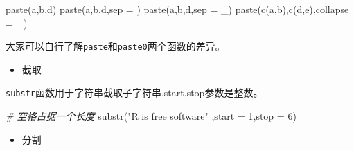 \documentclass[
]{book}
\newenvironment{Shaded}{\begin{snugshade}}{\end{snugshade}}
\newcommand{\AttributeTok}[1]{\textcolor[rgb]{0.77,0.63,0.00}{#1}}
\newcommand{\CommentTok}[1]{\textcolor[rgb]{0.56,0.35,0.01}{\textit{#1}}}
\newcommand{\DecValTok}[1]{\textcolor[rgb]{0.00,0.00,0.81}{#1}}
\newcommand{\FunctionTok}[1]{\textcolor[rgb]{0.00,0.00,0.00}{#1}}
\newcommand{\NormalTok}[1]{#1}
\newcommand{\StringTok}[1]{\textcolor[rgb]{0.31,0.60,0.02}{#1}}
\providecommand{\tightlist}{%
  \setlength{\itemsep}{0pt}\setlength{\parskip}{0pt}}
\begin{document}
\begin{Shaded}
\begin{Highlighting}[]
\FunctionTok{paste}\NormalTok{(}\StringTok{\textquotesingle{}a\textquotesingle{}}\NormalTok{,}\StringTok{\textquotesingle{}b\textquotesingle{}}\NormalTok{,}\StringTok{\textquotesingle{}d\textquotesingle{}}\NormalTok{)}
\FunctionTok{paste}\NormalTok{(}\StringTok{\textquotesingle{}a\textquotesingle{}}\NormalTok{,}\StringTok{\textquotesingle{}b\textquotesingle{}}\NormalTok{,}\StringTok{\textquotesingle{}d\textquotesingle{}}\NormalTok{,}\AttributeTok{sep =} \StringTok{\textquotesingle{}\textquotesingle{}}\NormalTok{)}
\FunctionTok{paste}\NormalTok{(}\StringTok{\textquotesingle{}a\textquotesingle{}}\NormalTok{,}\StringTok{\textquotesingle{}b\textquotesingle{}}\NormalTok{,}\StringTok{\textquotesingle{}d\textquotesingle{}}\NormalTok{,}\AttributeTok{sep =} \StringTok{\textquotesingle{}\_\textquotesingle{}}\NormalTok{)}
\FunctionTok{paste}\NormalTok{(}\FunctionTok{c}\NormalTok{(}\StringTok{\textquotesingle{}a\textquotesingle{}}\NormalTok{,}\StringTok{\textquotesingle{}b\textquotesingle{}}\NormalTok{),}\FunctionTok{c}\NormalTok{(}\StringTok{\textquotesingle{}d\textquotesingle{}}\NormalTok{,}\StringTok{\textquotesingle{}e\textquotesingle{}}\NormalTok{),}\AttributeTok{collapse =} \StringTok{\textquotesingle{}\_\textquotesingle{}}\NormalTok{)}
\end{Highlighting}
\end{Shaded}

大家可以自行了解\texttt{paste}和\texttt{paste0}两个函数的差异。

\begin{itemize}
\tightlist
\item
  截取
\end{itemize}

\texttt{substr}函数用于字符串截取子字符串,start,stop参数是整数。

\begin{Shaded}
\begin{Highlighting}[]
\CommentTok{\# 空格占据一个长度}
\FunctionTok{substr}\NormalTok{(}\StringTok{"R is free software"}\NormalTok{ ,}\AttributeTok{start =} \DecValTok{1}\NormalTok{,}\AttributeTok{stop =} \DecValTok{6}\NormalTok{)}
\end{Highlighting}
\end{Shaded}

\begin{itemize}
\tightlist
\item
  分割
\end{itemize}
\end{document}
